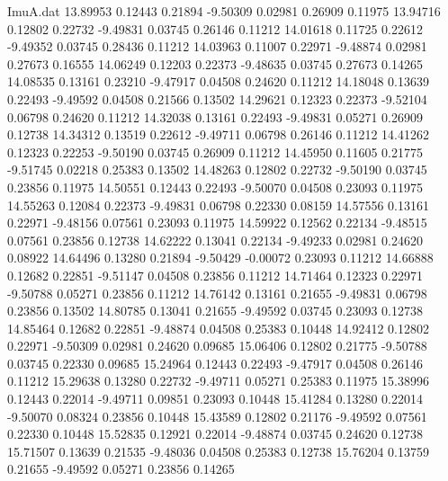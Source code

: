 \begin{filecontents}{ImuA.dat}
  13.89953    0.12443    0.21894   -9.50309    0.02981    0.26909    0.11975
  13.94716    0.12802    0.22732   -9.49831    0.03745    0.26146    0.11212
  14.01618    0.11725    0.22612   -9.49352    0.03745    0.28436    0.11212
  14.03963    0.11007    0.22971   -9.48874    0.02981    0.27673    0.16555
  14.06249    0.12203    0.22373   -9.48635    0.03745    0.27673    0.14265
  14.08535    0.13161    0.23210   -9.47917    0.04508    0.24620    0.11212
  14.18048    0.13639    0.22493   -9.49592    0.04508    0.21566    0.13502
  14.29621    0.12323    0.22373   -9.52104    0.06798    0.24620    0.11212
  14.32038    0.13161    0.22493   -9.49831    0.05271    0.26909    0.12738
  14.34312    0.13519    0.22612   -9.49711    0.06798    0.26146    0.11212
  14.41262    0.12323    0.22253   -9.50190    0.03745    0.26909    0.11212
  14.45950    0.11605    0.21775   -9.51745    0.02218    0.25383    0.13502
  14.48263    0.12802    0.22732   -9.50190    0.03745    0.23856    0.11975
  14.50551    0.12443    0.22493   -9.50070    0.04508    0.23093    0.11975
  14.55263    0.12084    0.22373   -9.49831    0.06798    0.22330    0.08159
  14.57556    0.13161    0.22971   -9.48156    0.07561    0.23093    0.11975
  14.59922    0.12562    0.22134   -9.48515    0.07561    0.23856    0.12738
  14.62222    0.13041    0.22134   -9.49233    0.02981    0.24620    0.08922
  14.64496    0.13280    0.21894   -9.50429   -0.00072    0.23093    0.11212
  14.66888    0.12682    0.22851   -9.51147    0.04508    0.23856    0.11212
  14.71464    0.12323    0.22971   -9.50788    0.05271    0.23856    0.11212
  14.76142    0.13161    0.21655   -9.49831    0.06798    0.23856    0.13502
  14.80785    0.13041    0.21655   -9.49592    0.03745    0.23093    0.12738
  14.85464    0.12682    0.22851   -9.48874    0.04508    0.25383    0.10448
  14.92412    0.12802    0.22971   -9.50309    0.02981    0.24620    0.09685
  15.06406    0.12802    0.21775   -9.50788    0.03745    0.22330    0.09685
  15.24964    0.12443    0.22493   -9.47917    0.04508    0.26146    0.11212
  15.29638    0.13280    0.22732   -9.49711    0.05271    0.25383    0.11975
  15.38996    0.12443    0.22014   -9.49711    0.09851    0.23093    0.10448
  15.41284    0.13280    0.22014   -9.50070    0.08324    0.23856    0.10448
  15.43589    0.12802    0.21176   -9.49592    0.07561    0.22330    0.10448
  15.52835    0.12921    0.22014   -9.48874    0.03745    0.24620    0.12738
  15.71507    0.13639    0.21535   -9.48036    0.04508    0.25383    0.12738
  15.76204    0.13759    0.21655   -9.49592    0.05271    0.23856    0.14265

\end{filecontents}
